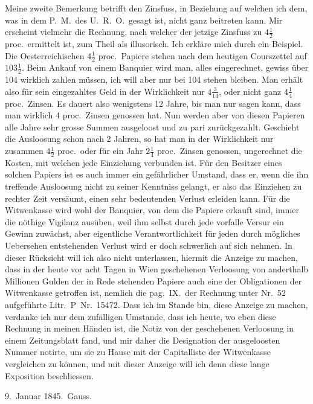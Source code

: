 \documentclass[12pt,a4paper]{article}
\begin{document}
Meine zweite Bemerkung betrifft den Zinsfuss, in Beziehung auf welchen ich dem, was in dem P.\ M.\ des U.\ R.\ O.\ gesagt ist, nicht ganz beitreten kann. Mir erscheint vielmehr die Rechnung, nach welcher der jetzige Zinsfuss zu $4\frac{1}{2}$ proc.\ ermittelt ist, zum Theil als illusorisch. Ich erkl\"are mich durch ein Beispiel. Die Oesterreichischen $4\frac{1}{2}$ proc.\ Papiere stehen nach dem heutigen Courszettel auf $103\frac{1}{2}$. Beim Ankauf von einem Banquier wird man, alles eingerechnet, gewiss \"uber 104 wirklich zahlen m\"ussen, ich will aber nur bei 104 stehen bleiben. Man erh\"alt also f\"ur sein eingezahltes Geld in der Wirklichkeit nur $4\frac{3}{14}$, oder nicht ganz $4\frac{1}{4}$ proc.\ Zinsen. Es dauert also wenigstens 12 Jahre, bis man nur sagen kann, dass man wirklich 4 proc.\ Zinsen genossen hat. Nun werden aber von diesen Papieren alle Jahre sehr grosse Summen ausgeloost und zu pari zur\"uckgezahlt. Geschieht die Ausloosung schon nach 2 Jahren, so hat man in der Wirklichkeit nur zusammen $4\frac{1}{2}$ proc.\ oder f\"ur ein Jahr $2\frac{1}{4}$ proc.\ Zinsen genossen, ungerechnet die Kosten, mit welchen jede Einziehung verbunden ist. F\"ur den Besitzer eines solchen Papiers ist es auch immer ein gef\"ahrlicher Umstand, dass er, wenn die ihn treffende Ausloosung nicht zu seiner Kenntniss gelangt, er also das Einziehen zu rechter Zeit vers\"aumt, einen sehr bedeutenden Verlust erleiden kann. F\"ur die Witwenkasse wird wohl der Banquier, von dem die Papiere erkauft sind, immer die n\"othige Vigilanz aus\"uben, weil ihm selbst durch jede vorfalle Versur ein Gewinn zuw\"achst, aber eigentliche Verantwortlichkeit f\"ur jeden durch m\"ogliches Uebersehen entstehenden Verlust wird er doch schwerlich auf sich nehmen. In dieser R\"ucksicht will ich also nicht unterlassen, hiermit die Anzeige zu machen, dass in der heute vor acht Tagen in Wien geschehenen Verloosung von anderthalb Millionen Gulden der in Rede stehenden Papiere auch eine der Obligationen der Witwenkasse getroffen ist, nemlich die pag.\ IX.\ der Rechnung unter Nr.\ 52 aufgef\"uhrte Litr.\ P\ Nr.\ 15472. Dass ich im Stande bin, diese Anzeige zu machen, verdanke ich nur dem zuf\"alligen Umstande, dass ich heute, wo eben diese Rechnung in meinen H\"anden ist, die Notiz von der geschehenen Verloosung in einem Zeitungsblatt fand, und mir daher die Designation der ausgeloosten Nummer notirte, um sie zu Hause mit der Capitalliste der Witwenkasse vergleichen zu k\"onnen, und mit dieser Anzeige will ich denn diese lange Exposition beschliessen.

\begin{flushright}
9.\ Januar 1845.\ Gauss.
\end{flushright}
\end{document}
